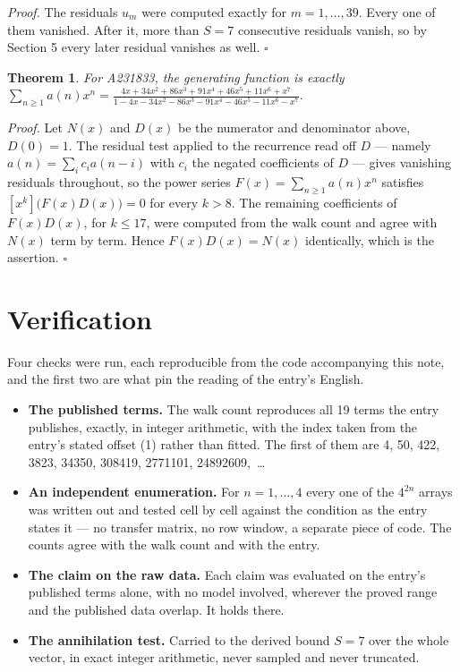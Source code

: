 \documentclass[11pt]{article}
\newtheorem{theorem}{Theorem}
\theoremstyle{definition}
\begin{document}
{\itshape Proof.} The residuals $u_m$ were computed exactly for $m = 1,\dots,39$. Every one of them vanished. After it, more than $S = 7$ consecutive residuals vanish, so by Section 5 every later residual vanishes as well. $\square$

\begin{theorem} For A231833, the generating function is exactly $\sum_{n\ge 1} a(n)x^n = \frac{4x + 34x^{2} + 86x^{3} + 91x^{4} + 46x^{5} + 11x^{6} + x^{7}}{1 - 4x - 34x^{2} - 86x^{3} - 91x^{4} - 46x^{5} - 11x^{6} - x^{7}}$.\end{theorem}

{\itshape Proof.} Let $N(x)$ and $D(x)$ be the numerator and denominator above, $D(0)=1$. The residual test applied to the recurrence read off $D$ --- namely $a(n) = \sum_i c_i a(n-i)$ with $c_i$ the negated coefficients of $D$ --- gives vanishing residuals throughout, so the power series $F(x)=\sum_{n\ge 1}a(n)x^n$ satisfies $[x^k]\bigl(F(x)D(x)\bigr) = 0$ for every $k > 8$. The remaining coefficients of $F(x)D(x)$, for $k \le 17$, were computed from the walk count and agree with $N(x)$ term by term. Hence $F(x)D(x) = N(x)$ identically, which is the assertion. $\square$

\section{Verification}

Four checks were run, each reproducible from the code accompanying this note, and the first two are what pin the reading of the entry's English.

\begin{itemize}

\item {\bfseries The published terms.} The walk count reproduces all 19 terms the entry publishes, exactly, in integer arithmetic, with the index taken from the entry's stated offset (1) rather than fitted. The first of them are 4, 50, 422, 3823, 34350, 308419, 2771101, 24892609,~\dots

\item {\bfseries An independent enumeration.} For $n = 1,\dots,4$ every one of the $4^{2n}$ arrays was written out and tested cell by cell against the condition as the entry states it --- no transfer matrix, no row window, a separate piece of code. The counts agree with the walk count and with the entry.

\item {\bfseries The claim on the raw data.} Each claim was evaluated on the entry's published terms alone, with no model involved, wherever the proved range and the published data overlap. It holds there.

\item {\bfseries The annihilation test.} Carried to the derived bound $S = 7$ over the whole vector, in exact integer arithmetic, never sampled and never truncated.

\end{itemize}
\end{document}

